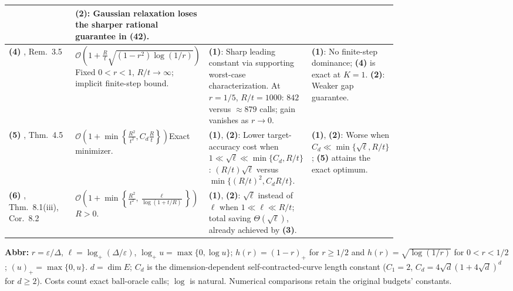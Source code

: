 \begin{table}[tp]
\begin{threeparttable}
\begin{tabularx}{\linewidth}{@{}>{\raggedright\arraybackslash}p{0.20\linewidth}>{\raggedright\arraybackslash}p{0.32\linewidth}>{\raggedright\arraybackslash}p{0.25\linewidth}>{\raggedright\arraybackslash}X@{}}
& \textbf{(2)}: Gaussian relaxation loses the sharper rational guarantee in (42). \\
\midrule
\textbf{(4)} \citep{RichtarikLi2026BallV1}, Rem.~3.5
& $\mathcal{O}\!\left(1+\frac Rt\sqrt{(1-r^2)\log(1/r)}\right)$\newline Fixed $0<r<1$, $R/t\to\infty$; implicit finite-step bound.
& \textbf{(1)}: Sharp leading constant via supporting worst-case characterization. At $r=1/5$, $R/t=1000$: $842$ versus $\approx879$ calls; gain vanishes as $r\to0$.
& \textbf{(1)}: No finite-step dominance; \textbf{(4)} is exact at $K=1$. \textbf{(2)}: Weaker gap guarantee. \\
\midrule
\textbf{(5)} \citep{RichtarikLi2026BallV1}, Thm.~4.5
& $\mathcal{O}\!\left(1+\min\!\left\{\frac{R^2}{t^2},C_d\frac Rt\right\}\right)$\newline Exact minimizer.
& \textbf{(1)}, \textbf{(2)}: Lower target-accuracy cost when $1\ll\sqrt\ell\ll\min\{C_d,R/t\}$: $(R/t)\sqrt\ell$ versus $\min\{(R/t)^2,C_dR/t\}$.
& \textbf{(1)}, \textbf{(2)}: Worse when $C_d\ll\min\{\sqrt\ell,R/t\}$; \textbf{(5)} attains the exact optimum. \\
\midrule
\textbf{(6)} \citep{GruntkowskaEtAl2025BallV2}, Thm.~8.1(iii), Cor.~8.2
& $\mathcal{O}\!\left(1+\min\!\left\{\frac{R^2}{t^2},\frac{\ell}{\log(1+t/R)}\right\}\right)$\newline $R>0$.
& \textbf{(1)}, \textbf{(2)}: $\sqrt\ell$ instead of $\ell$ when $1\ll\ell\ll R/t$; total saving $\Theta(\sqrt\ell)$, already achieved by \textbf{(3)}.
& \\
\bottomrule
\end{tabularx}
\begin{tablenotes}[flushleft]\footnotesize
\item[] \textbf{Abbr:} $r=\varepsilon/\Delta$, $\ell=\log_+(\Delta/\varepsilon)$, $\log_+u=\max\{0,\log u\}$; $h(r)=(1-r)_+$ for $r\ge1/2$ and $h(r)=\sqrt{\log(1/r)}$ for $0<r<1/2$; $(u)_+=\max\{0,u\}$. $d=\dim E$; $C_d$ is the dimension-dependent self-contracted-curve length constant ($C_1=2$, $C_d=4\sqrt d(1+4\sqrt d)^d$ for $d\ge2$). Costs count exact ball-oracle calls; $\log$ is natural. Numerical comparisons retain the original budgets' constants.
\end{tablenotes}
\end{threeparttable}
\end{table}
\clearpage
